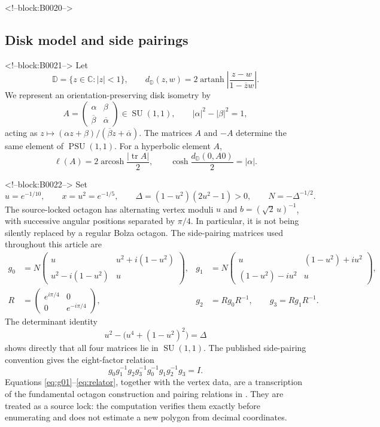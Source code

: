 \documentclass[11pt,a4paper]{article}
\theoremstyle{definition}
\newcommand{\D}{\mathbb D}
\newcommand{\C}{\mathbb C}
\newcommand{\PSU}{\operatorname{PSU}}
\newcommand{\SU}{\operatorname{SU}}
\newcommand{\tr}{\operatorname{tr}}
\newcommand{\arcosh}{\operatorname{arcosh}}
\newcommand{\length}{\ell}
\begin{document}
<!--block:B0020-->
\subsection{Disk model and side pairings}

<!--block:B0021-->
Let
\[
 \D=\{z\in\C:|z|<1\},\qquad
 d_{\D}(z,w)=2\operatorname{artanh}
 \left|\frac{z-w}{1-\overline z w}\right|.
\]
We represent an orientation-preserving disk isometry by
\[
 A=\begin{pmatrix}\alpha&\beta\\
 \overline\beta&\overline\alpha\end{pmatrix}\in\SU(1,1),
 \qquad |\alpha|^2-|\beta|^2=1,
\]
acting as \(z\mapsto(\alpha z+\beta)/(\overline\beta z+
\overline\alpha)\).  The matrices \(A\) and \(-A\) determine the same element
of \(\PSU(1,1)\).  For a hyperbolic element \(A\),
\begin{equation}\label{eq:length-trace}
 \length(A)=2\arcosh\frac{|\tr A|}{2},
 \qquad
 \cosh\frac{d_{\D}(0,A0)}{2}=|\alpha|.
\end{equation}

<!--block:B0022-->
Set
\begin{equation}\label{eq:parameters}
 u=e^{-1/10},\qquad x=u^2=e^{-1/5},\qquad
 \Delta=(1-u^2)(2u^2-1)>0,
 \qquad N=-\Delta^{-1/2}.
\end{equation}
The source-locked octagon has alternating vertex moduli
\(u\) and \(b=(\sqrt2\,u)^{-1}\), with successive angular positions separated
by \(\pi/4\).  In particular, it is not being silently replaced by a regular
Bolza octagon.  The side-pairing matrices used throughout this article are
\begin{align}
 g_0&=N\begin{pmatrix}
 u&u^2+i(1-u^2)\\ u^2-i(1-u^2)&u
 \end{pmatrix},
 &
 g_1&=N\begin{pmatrix}
 u&(1-u^2)+iu^2\\ (1-u^2)-iu^2&u
 \end{pmatrix},\label{eq:g01}\\
 R&=\begin{pmatrix}e^{i\pi/4}&0\\0&e^{-i\pi/4}\end{pmatrix},
 &g_2&=Rg_0R^{-1},\qquad g_3=Rg_1R^{-1}.
 \label{eq:g23}
\end{align}
The determinant identity
\[
 u^2-\bigl(u^4+(1-u^2)^2\bigr)=\Delta
\]
shows directly that all four matrices lie in \(\SU(1,1)\).  The published
side-pairing convention gives the eight-factor relation
\begin{equation}\label{eq:relator}
 g_0g_1^{-1}g_2g_3^{-1}g_0^{-1}g_1g_2^{-1}g_3=I.
\end{equation}
Equations \eqref{eq:g01}--\eqref{eq:relator}, together with the vertex data,
are a transcription of the fundamental octagon construction and pairing
relations in \cite[eqs.~(10)--(18)]{Nazarenko2013}.  They are treated as a
source lock: the computation verifies them exactly before enumerating and
does not estimate a new polygon from decimal coordinates.
\end{document}
